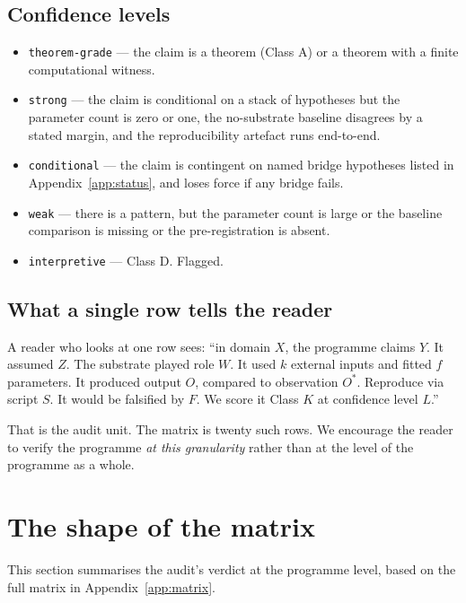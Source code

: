 \documentclass[11pt,a4paper]{article}
\begin{document}
\subsection{Confidence levels}
\label{sec:confidence}

\begin{itemize}[leftmargin=*]
  \item \texttt{theorem-grade} --- the claim is a theorem (Class A)
        or a theorem with a finite computational witness.
  \item \texttt{strong} --- the claim is conditional on a stack of
        hypotheses but the parameter count is zero or one, the
        no-substrate baseline disagrees by a stated margin, and the
        reproducibility artefact runs end-to-end.
  \item \texttt{conditional} --- the claim is contingent on named
        bridge hypotheses listed in Appendix~\ref{app:status}, and
        loses force if any bridge fails.
  \item \texttt{weak} --- there is a pattern, but the parameter
        count is large or the baseline comparison is missing or the
        pre-registration is absent.
  \item \texttt{interpretive} --- Class D. Flagged.
\end{itemize}

\subsection{What a single row tells the reader}

A reader who looks at one row sees: ``in domain $X$, the programme
claims $Y$. It assumed $Z$. The substrate played role $W$. It used
$k$ external inputs and fitted $f$ parameters. It produced output
$O$, compared to observation $O^*$. Reproduce via script $S$. It
would be falsified by $F$. We score it Class $K$ at confidence
level $L$.''

That is the audit unit. The matrix is twenty such rows. We
encourage the reader to verify the programme \emph{at this
granularity} rather than at the level of the programme as a whole.

\section{The shape of the matrix}
\label{sec:shape}

This section summarises the audit's verdict at the programme level,
based on the full matrix in Appendix~\ref{app:matrix}.
\end{document}
